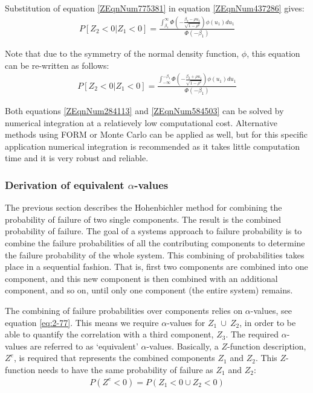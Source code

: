 Substitution of equation \eqref{ZEqnNum775381} in equation \eqref{ZEqnNum437286} gives:
\begin{align}
P\left[Z_{2} <0|Z_{1} <0\right]=\frac{\int _{\beta _{1} }^{\infty }\Phi \left(-\frac{\beta _{2} -\rho u_{1} }{\sqrt{1-\rho ^{2} } } \right)\phi \left(u_{1} \right)du_{1}  }{\Phi \left(-\beta _{1} \right)} \label{ZEqnNum284113} 
\end{align}

Note that due to the symmetry of the normal density function, $\phi$, this equation can be re-written as follows: 
\begin{align}
P\left[Z_{2} <0|Z_{1} <0\right]=\frac{\int _{-\infty }^{-\beta _{1} }\Phi \left(-\frac{\beta _{2} +\rho u_{1} }{\sqrt{1-\rho ^{2} } } \right)\phi \left(u_{1} \right)du_{1}  }{\Phi \left(-\beta _{1} \right)} \label{ZEqnNum584503} 
\end{align}

Both equations \eqref{ZEqnNum284113} and \eqref{ZEqnNum584503} can be solved by numerical integration at a relatievely low computational cost. Alternative methods using FORM or Monte Carlo can be applied as well, but for this specific application numerical integration is recommended as it takes little computation time and it is very robust and reliable.

\subsubsection{Derivation of equivalent $\alpha$-values}\label{Section_2.4.2.3}

The previous section describes the Hohenbichler method for combining the probability of failure of two single components. The result is the combined probability of failure. The goal of a systems approach to failure probability is to combine the failure probabilities of all the contributing components to determine the failure probability of the whole system. This combining of probabilities takes place in a sequential fashion. That is, first two components are combined into one component, and this new component is then combined with an additional component, and so on, until only one component (the entire system) remains. 

The combining of failure probabilities over components relies on $\alpha $-values, see equation \eqref{eq:2-77}. This means we require $\alpha$-values for $Z_1$$~\cup~$$Z_2$, in order to be able to quantify the correlation with a third component, $Z_3$. The required $\alpha$-values are referred to as `equivalent' $\alpha$-values. Basically, a $Z$-function description, $Z^e$, is required that represents the combined components $Z_1$ and $Z_2$. This $Z$-function needs to have the same probability of failure as $Z_1$ and $Z_2$:
\begin{align}
P(Z^{e} <0)=P\left(Z_{1} <0  \cup Z_{2} <0\right)\label{0.90)} 
\end{align}

